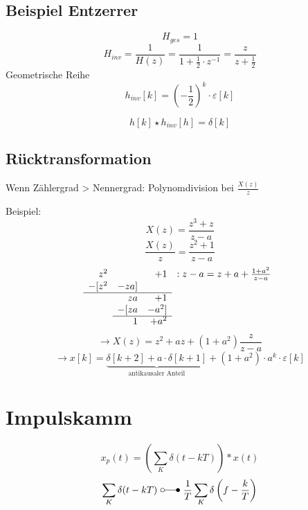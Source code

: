 \documentclass[a4paper, 10pt, fleqn]{article}
\begin{document}
\subsection{Beispiel Entzerrer}
\[ H_{ges} = 1 \]
\[ H_{inv} = \frac{1}{H(z)} = \frac{1}{1 + \frac{1}{2} \cdot z^{-1}} = \frac{z}{z + \frac{1}{2}} \]
Geometrische Reihe
\[ h_{inv}[k] = \left(-\frac{1}{2}\right)^k \cdot \varepsilon[k] \]
\[ h[k] \star h_{inv}[h] = \delta[k] \]

\subsection{Rücktransformation}
Wenn Zählergrad > Nennergrad: Polynomdivision bei $\frac{X(z)}{z}$

\noindent Beispiel: 
\[ X(z) = \frac{z^3 + z}{z - a} \]
\[ \frac{X(z)}{z} = \frac{z^2 + 1}{z - a} \]
\[
    \begin{array}{rrrrrl}
          z^2   &       & +1    & \multicolumn{3}{l}{: z - a = z + a + \frac{1 + a^2}{z - a}} \\
        -[z^2   & -z a ] \\
        \cline{1-3}
                &  z a  & +1 \\
                &-[  za & -a^2 ] \\
                \cline{2-3}
                & 1     & +a^2 \\
    \end{array}
\]
\[ \to X(z) = z^2 + a z + \left(1 + a^2\right) \frac{z}{z - a} \]
\[ \to x[k] = \underbrace{\delta[k+2] + a \cdot \delta[k+1]}_{\text{antikausaler Anteil}} + 
    \left(1 + a^2\right) \cdot a^k \cdot \varepsilon[k] \]

\section{Impulskamm}
\[ x_p(t) = \left(\sum\limits_{K}^{} \delta(t - kT)\right) * x(t) \]
\[ \sum\limits_{K} \delta (t - kT) ~ \laplace ~ \frac{1}{T} \sum\limits_{K} \delta \left(f - \frac{k}{T}\right)  \]
\end{document}
